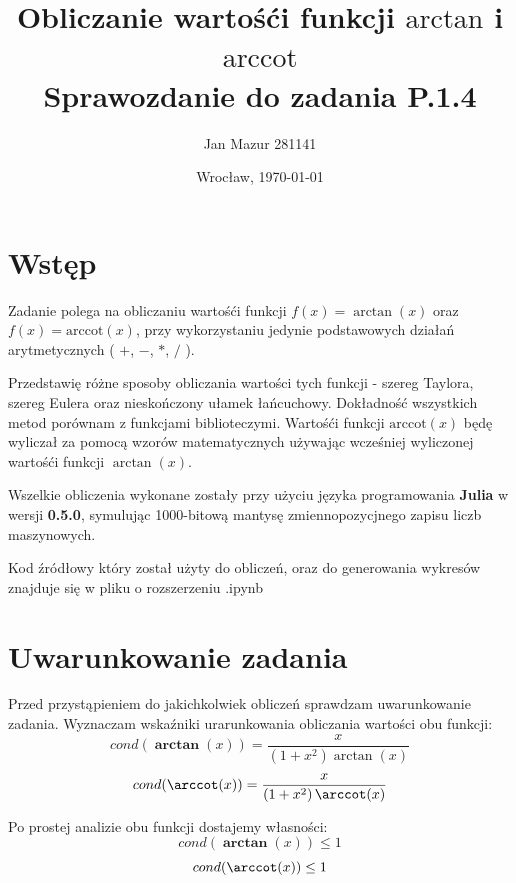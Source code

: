 \documentclass{article}
\author{Jan Mazur 281141}
\date{Wrocław, \today}
\title{\textbf{Obliczanie wartośći funkcji $\textrm{arctan}$ i $\textrm{arccot}$ } \\ Sprawozdanie do zadania P.1.4}
\begin{document}
\maketitle

\section{Wstęp}

Zadanie polega na obliczaniu wartośći funkcji $f(x) = \arctan(x)$ oraz\\ $f(x) = \textrm{arccot}(x)$, przy wykorzystaniu jedynie podstawowych działań arytmetycznych ( $+$, $-$, $*$, $/$ ).

\indent Przedstawię różne sposoby obliczania wartości tych funkcji - szereg Taylora, szereg Eulera oraz nieskończony ułamek łańcuchowy. 
Dokładność wszystkich metod porównam z funkcjami biblioteczymi.
Wartośći funkcji  $\textrm{arccot}(x)$ będę wyliczał za pomocą wzorów matematycznych używając wcześniej wyliczonej wartośći funkcji $\arctan(x)$.


\indent Wszelkie obliczenia wykonane zostały przy użyciu języka programowania \textbf{Julia} w wersji \textbf{0.5.0}, symulując 1000-bitową mantysę zmiennopozycjnego zapisu liczb maszynowych.

\indent Kod źródłowy który został użyty do obliczeń, oraz do generowania wykresów znajduje się w pliku o rozszerzeniu .ipynb

\section{Uwarunkowanie zadania}
Przed przystąpieniem do jakichkolwiek obliczeń sprawdzam uwarunkowanie zadania. Wyznaczam wskaźniki urarunkowania obliczania wartości obu funkcji:
\begin{equation*}{\displaystyle cond(\mathbf {\arctan}(x) )}=\frac{x}{\left ( 1+x^{2} \right )\arctan (x)}\end{equation*}
\begin{equation*}
{\displaystyle cond(\mathbf {\arccot}(x) )}=\frac{x}{\left ( 1+x^{2} \right )\arccot (x)}
\end{equation*}


\indent Po prostej analizie obu funkcji dostajemy własności:
\begin{equation*}
{\displaystyle cond(\mathbf {\arctan}(x) )} \leq 1
\end{equation*}
\begin{equation*}
{\displaystyle cond(\mathbf {\arccot}(x) )} \leq 1
\end{equation*}
\end{document}

